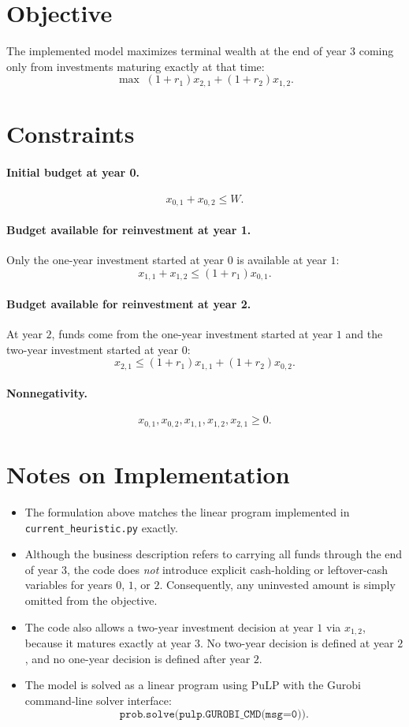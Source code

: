 \section*{Objective}

The implemented model maximizes terminal wealth at the end of year \(3\) coming only from investments maturing exactly at that time:
\[
\max \; (1+r_1)x_{2,1} + (1+r_2)x_{1,2}.
\]

\section*{Constraints}

\paragraph{Initial budget at year 0.}
\[
x_{0,1}+x_{0,2}\le W.
\]

\paragraph{Budget available for reinvestment at year 1.}
Only the one-year investment started at year \(0\) is available at year \(1\):
\[
x_{1,1}+x_{1,2}\le (1+r_1)x_{0,1}.
\]

\paragraph{Budget available for reinvestment at year 2.}
At year \(2\), funds come from the one-year investment started at year \(1\) and the two-year investment started at year \(0\):
\[
x_{2,1}\le (1+r_1)x_{1,1} + (1+r_2)x_{0,2}.
\]

\paragraph{Nonnegativity.}
\[
x_{0,1},x_{0,2},x_{1,1},x_{1,2},x_{2,1}\ge 0.
\]

\section*{Notes on Implementation}

\begin{itemize}
    \item The formulation above matches the linear program implemented in \texttt{current\_heuristic.py} exactly.
    \item Although the business description refers to carrying all funds through the end of year \(3\), the code does \emph{not} introduce explicit cash-holding or leftover-cash variables for years \(0\), \(1\), or \(2\). Consequently, any uninvested amount is simply omitted from the objective.
    \item The code also allows a two-year investment decision at year \(1\) via \(x_{1,2}\), because it matures exactly at year \(3\). No two-year decision is defined at year \(2\), and no one-year decision is defined after year \(2\).
    \item The model is solved as a linear program using PuLP with the Gurobi command-line solver interface:
    \[
    \texttt{prob.solve(pulp.GUROBI\_CMD(msg=0))}.
    \]
\end{itemize}
